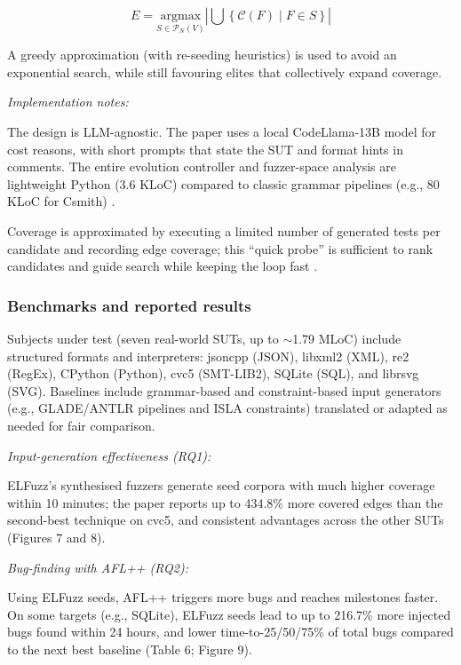 \[
E =  \underset{S\in \mathcal{P}_{N}(V)}{\mathrm{argmax}} \left|\bigcup \left\{ \mathcal{C}\left( F \right) \middle| F\in S  \right\}\right|
\]

A greedy approximation (with re-seeding heuristics) is used to avoid an exponential search, while still favouring elites that collectively expand coverage.

\lilspace
\textit{Implementation notes:}

The design is LLM-agnostic. The paper uses a local CodeLlama-13B model for cost reasons, with short prompts that state the SUT and format hints in comments. The entire evolution controller and fuzzer-space analysis are lightweight Python (3.6 KLoC) compared to classic grammar pipelines (e.g., 80 KLoC for Csmith) \cite{yang_2011_finding,chen_2025_elfuzz}.

Coverage is approximated by executing a limited number of generated tests per candidate and recording edge coverage; this ``quick probe'' is sufficient to rank candidates and guide search while keeping the loop fast \cite{chen_2025_elfuzz,gnuproject_2024_gcov}.

\subsubsection{Benchmarks and reported results}

Subjects under test (seven real-world SUTs, up to $\sim$1.79 MLoC) include structured formats and interpreters: jsoncpp (JSON), libxml2 (XML), re2 (RegEx), CPython (Python), cvc5 (SMT-LIB2), SQLite (SQL), and librsvg (SVG). Baselines include grammar-based and constraint-based input generators (e.g., GLADE/ANTLR pipelines and ISLA constraints) translated or adapted as needed for fair comparison.

\lilspace
\textit{Input-generation effectiveness (RQ1):}

ELFuzz's synthesised fuzzers generate seed corpora with much higher coverage within 10 minutes; the paper reports up to 434.8\% more covered edges than the second-best technique on cvc5, and consistent advantages across the other SUTs (Figures 7 and 8).

\lilspace
\textit{Bug-finding with AFL++ (RQ2):}

Using ELFuzz seeds, AFL++ triggers more bugs and reaches milestones faster. On some targets (e.g., SQLite), ELFuzz seeds lead to up to 216.7\% more injected bugs found within 24 hours, and lower time-to-25/50/75\% of total bugs compared to the next best baseline (Table 6; Figure 9).

